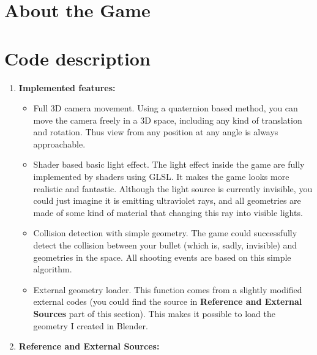 \documentclass{article}
\begin{document}
\section{About the Game}

\section{Code description}

	\begin{enumerate}
		
		\item {\bf Implemented features:}

			\begin{itemize}
				\item Full 3D camera movement.
					Using a quaternion based method, you can move the camera freely in a 3D space, including any kind of translation and rotation. 
					Thus view from any position at any angle is always approachable.
				
				\item Shader based basic light effect.
					The light effect inside the game are fully implemented by shaders using GLSL.
					It makes the game looks more realistic and fantastic.
					Although the light source is currently invisible, you could just imagine it is emitting ultraviolet rays, and all geometries are made of some kind of material that changing this ray into visible lights.

				\item Collision detection with simple geometry.
					The game could successfully detect the collision between your bullet (which is, sadly, invisible) and geometries in the space.
					All shooting events are based on this simple algorithm.

				\item External geometry loader.
					This function comes from a slightly modified external codes (you could find the source in {\bf Reference and External Sources} part of this section).
					This makes it possible to load the geometry I created in Blender.

			\end{itemize}

		\item {\bf Reference and External Sources:}

	\end{enumerate}
\end{document}
